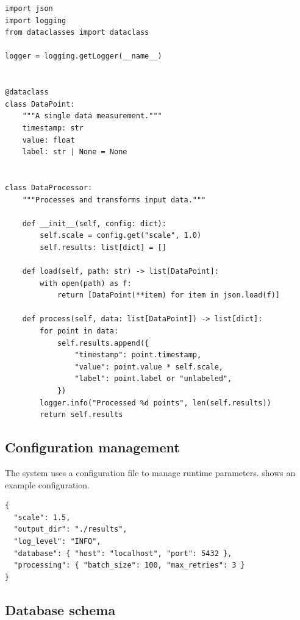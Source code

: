 \begin{codelisting}[htbp]
  \caption{Data processor module (processor.py)}\label{lst:processor}
\begin{verbatim}
import json
import logging
from dataclasses import dataclass

logger = logging.getLogger(__name__)


@dataclass
class DataPoint:
    """A single data measurement."""
    timestamp: str
    value: float
    label: str | None = None


class DataProcessor:
    """Processes and transforms input data."""

    def __init__(self, config: dict):
        self.scale = config.get("scale", 1.0)
        self.results: list[dict] = []

    def load(self, path: str) -> list[DataPoint]:
        with open(path) as f:
            return [DataPoint(**item) for item in json.load(f)]

    def process(self, data: list[DataPoint]) -> list[dict]:
        for point in data:
            self.results.append({
                "timestamp": point.timestamp,
                "value": point.value * self.scale,
                "label": point.label or "unlabeled",
            })
        logger.info("Processed %d points", len(self.results))
        return self.results
\end{verbatim}
\end{codelisting}

\subsection{Configuration management}

The system uses a configuration file to manage runtime parameters.
 shows an example configuration.

\begin{codelisting}[htbp]
  \caption{Example configuration file (config.json)}\label{lst:config}
\begin{verbatim}
{
  "scale": 1.5,
  "output_dir": "./results",
  "log_level": "INFO",
  "database": { "host": "localhost", "port": 5432 },
  "processing": { "batch_size": 100, "max_retries": 3 }
}
\end{verbatim}
\end{codelisting}

\subsection{Database schema}

